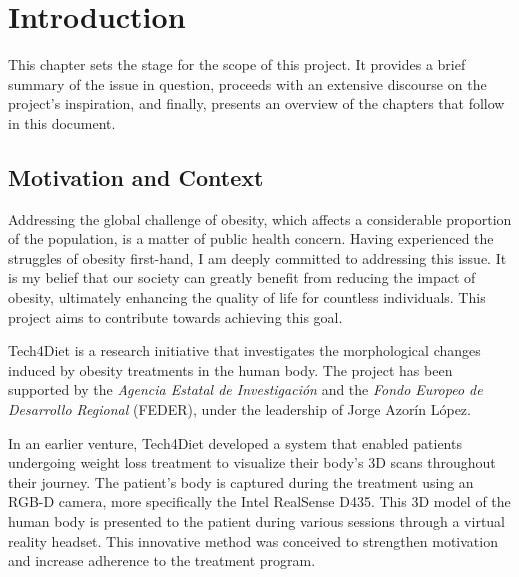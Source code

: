\chapter{Introduction}\label{chap:introduction}

This chapter sets the stage for the scope of this project. It provides a brief
summary of the issue in question, proceeds with an extensive discourse on the
project's inspiration, and finally, presents an overview of the chapters that
follow in this document.

\section{Motivation and Context}

Addressing the global challenge of obesity, which affects a considerable
proportion of the population, is a matter of public health concern. Having
experienced the struggles of obesity first-hand, I am deeply committed to
addressing this issue. It is my belief that our society can greatly benefit
from reducing the impact of obesity, ultimately enhancing the quality of life
for countless individuals. This project aims to contribute towards achieving
this goal.

Tech4Diet is a research initiative that investigates the morphological changes
induced by obesity treatments in the human body. The project has been supported
by the \textit{Agencia Estatal de Investigación} and the \textit{Fondo Europeo
	de Desarrollo Regional} (FEDER), under the leadership of Jorge Azorín López.

In an earlier venture, Tech4Diet developed a system that enabled patients
undergoing weight loss treatment to visualize their body's 3D scans throughout
their journey. The patient's body is captured during the treatment using an
RGB-D camera, more specifically the Intel RealSense D435. This 3D model of the
human body is presented to the patient during various sessions through a
virtual reality headset. This innovative method was conceived to strengthen
motivation and increase adherence to the treatment program.


